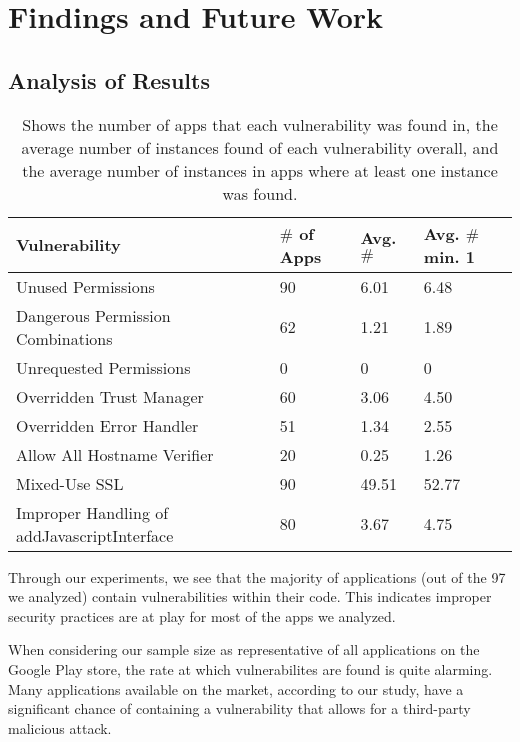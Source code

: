 \section{Findings and Future Work}
\label{sec:relwork}

\subsection{Analysis of Results}
\begin{table}[h!]
    \centering
    \begin{tabular}{| m{4cm} | m{0.75cm}| m{0.75cm} | m{0.75cm} |} \hline
        Vulnerability & $\#$ of Apps & Avg. $\#$ & Avg. $\#$ min. 1\\ \hline
        Unused Permissions & 90 & 6.01 & 6.48\\ \hline
        Dangerous Permission Combinations & 62 & 1.21 & 1.89\\ \hline            
        Unrequested Permissions & 0 & 0 & 0\\ \hline
        Overridden Trust Manager & 60 & 3.06 & 4.50\\ \hline
        Overridden Error Handler & 51  & 1.34 & 2.55\\ \hline
        Allow All Hostname Verifier & 20 & 0.25 & 1.26\\ \hline
        Mixed-Use SSL& 90 & 49.51 & 52.77 \\ \hline
        Improper Handling of addJavascriptInterface & 80 & 3.67 & 4.75 \\ \hline
    \end{tabular}
    \caption{Shows the number of apps that each vulnerability was found in, the average number of instances found of each vulnerability overall, and the average number of instances in apps where at least one instance was found.}
    \label{tab:my_label}
\end{table}

Through our experiments, we see that the majority of applications
(out of the 97 we analyzed) contain vulnerabilities within their
code. This indicates improper security practices are at play for 
most of the apps we analyzed.

When considering our sample size as representative of all 
applications on the Google Play store, the rate at which 
vulnerabilites are found is quite alarming. Many applications
available on the market, according to our study, have a significant 
chance of containing a vulnerability that allows for a third-party 
malicious attack.

